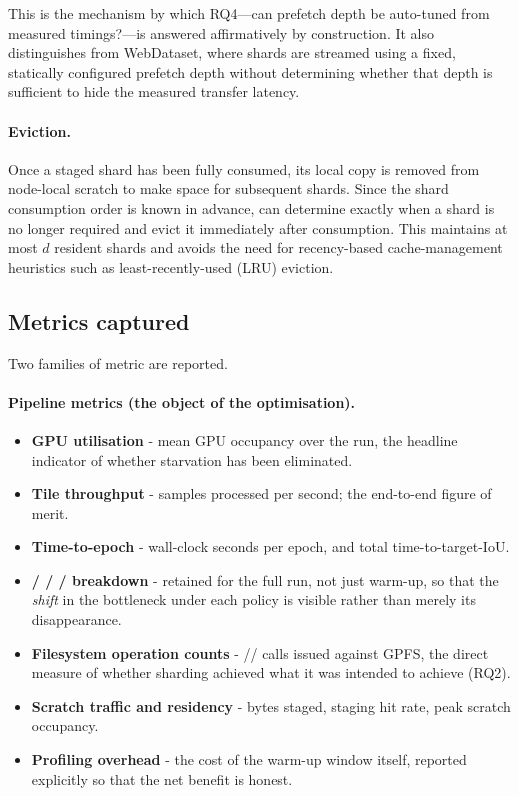 This is the mechanism by which RQ4---can prefetch depth be auto-tuned from measured timings?---is answered affirmatively by construction. It also distinguishes \pads{} from WebDataset, where shards are streamed using a fixed, statically configured prefetch depth without determining whether that depth is sufficient to hide the measured transfer latency.

\paragraph{Eviction.}
Once a staged shard has been fully consumed, its local copy is removed from node-local scratch to make space for subsequent shards. Since the shard consumption order is known in advance, \pads{} can determine exactly when a shard is no longer required and evict it immediately after consumption. This maintains at most $d$ resident shards and avoids the need for recency-based cache-management heuristics such as least-recently-used (LRU) eviction.

\subsection{Metrics captured}

Two families of metric are reported.

\paragraph{Pipeline metrics (the object of the optimisation).}
\begin{itemize}
  \item \textbf{GPU utilisation} - mean GPU occupancy over the run, the
    headline indicator of whether starvation has been eliminated.
  \item \textbf{Tile throughput} - samples processed per second; the end-to-end
    figure of merit.
  \item \textbf{Time-to-epoch} - wall-clock seconds per epoch, and total
    time-to-target-IoU.
  \item \textbf{\Tdata{} / \Tdecode{} / \Thtod{} / \Tgpu{} breakdown} - retained
    for the full run, not just warm-up, so that the \emph{shift} in the bottleneck
    under each policy is visible rather than merely its disappearance.
  \item \textbf{Filesystem operation counts} - //
    calls issued against GPFS, the direct measure of whether sharding achieved what
    it was intended to achieve (RQ2).
  \item \textbf{Scratch traffic and residency} - bytes staged, staging hit rate,
    peak scratch occupancy.
  \item \textbf{Profiling overhead} - the cost of the warm-up window itself,
    reported explicitly so that the net benefit is honest.
\end{itemize}


